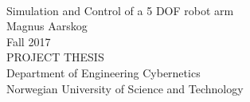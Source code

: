 \documentclass[10pt,b5paper,twoside,openright]{book}
\begin{document}
\pagestyle{plain}

\thispagestyle{empty}
\mbox{}\\[6pc]
\begin{center}
\Huge{Simulation and Control of a 5 DOF robot arm}\\[2pc]

\Large{Magnus Aarskog}\\[1pc]
\large{Fall 2017}\\[2pc]

PROJECT THESIS\\
Department of Engineering Cybernetics\\
Norwegian University of Science and Technology
\end{center}
\vfill


\frontmatter
\pagestyle{plain}
\begingroup
\let\cleardoublepage\clearpage



\tableofcontents \clearpage
\listoftables    \clearpage
\listoffigures   \clearpage
\endgroup



\mainmatter
\pagestyle{headings}










%
%
%
%


\backmatter
{}

\end{document}
